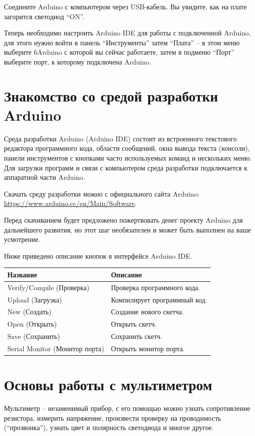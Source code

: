 \documentclass[a4paper,twoside]{book}
\begin{document}
Соедините Arduino с компьютером через USB-кабель. Вы увидите, как на плате
загорится светодиод ``ON''.

Теперь необходимо настроить Arduino IDE для работы с подключенной Arduino, для
этого нужно войти в панель ``Инструменты'' затем ``Плата'' -- в этом меню
выберите 6Arduino с которой вы сейчас работаете, затем в подменю ``Порт''
выберите порт, к которому подключена Arduino.

\section{Знакомство со средой разработки Arduino}
Среда разработки Arduino (Arduino IDE) состоит из встроенного текстового
редактора программного кода, области сообщений, окна вывода текста (консоли),
панели инструментов с кнопками часто используемых команд и нескольких меню. Для
загрузки программ и связи с компьютером среда разработки подключается к
аппаратной части Arduino.

Скачать среду разработки можно с официального сайта Arduino:
\url{https://www.arduino.cc/en/Main/Software}.

Перед скачиванием будет предложено пожертвовать денег проекту Arduino для
дальнейшего развития, но этот шаг необязателен и может быть выполнен на ваше
усмотрение.

Ниже приведено описание кнопок в интерфейсе Arduino IDE.

\begin{tabular}{p{4cm}|p{6cm}}
  Название & Описание \\
  \hline \hline
  Verify/Compile (Проверка) & Проверка программного кода. \\
  \hline
  Upload (Загрузка) & Компилирует программный код.\\
  \hline
  New (Создать) & Создание нового скетча.\\
  \hline
  Open (Открыть) & Открыть скетч.\\
  \hline
  Save (Сохранить) & Сохранить скетч.\\
  \hline
  Serial Monitor (Монитор порта) & Открыть монитор порта.\\
\end{tabular}

\section{Основы работы с мультиметром}
Мультиметр -- незаменимый прибор, с его помощью можно узнать сопротивление
резистора, измерить напряжение, произвести проверку на проводимость
(``прозвонка''), узнать цвет и полярность светодиода и многое другое.
\end{document}
